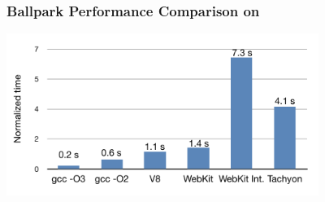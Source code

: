 % 

% 
% 
% 

\begin{frame}
\frametitle{\bf Ballpark Performance Comparison on }

\begin{center}
\includegraphics[width=4in]{images/perf-fib38}
\end{center}

\end{frame}

